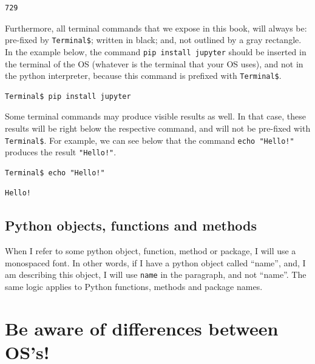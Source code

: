 \documentclass[
  11pt,
  letterpaper,
  DIV=11,
  numbers=noendperiod]{scrreprt}
\begin{document}
\begin{verbatim}
729
\end{verbatim}

Furthermore, all terminal commands that we expose in this book, will
always be: pre-fixed by \texttt{Terminal\$}; written in black; and, not
outlined by a gray rectangle. In the example below, the command
\texttt{pip\ install\ jupyter} should be inserted in the terminal of the
OS (whatever is the terminal that your OS uses), and not in the python
interpreter, because this command is prefixed with \texttt{Terminal\$}.

\begin{verbatim}
Terminal$ pip install jupyter
\end{verbatim}

Some terminal commands may produce visible results as well. In that
case, these results will be right below the respective command, and will
not be pre-fixed with \texttt{Terminal\$}. For example, we can see below
that the command \texttt{echo\ "Hello!"} produces the result
\texttt{"Hello!"}.

\begin{verbatim}
Terminal$ echo "Hello!"
\end{verbatim}

\begin{verbatim}
Hello!
\end{verbatim}

\hypertarget{python-objects-functions-and-methods}{%
\subsection*{Python objects, functions and
methods}\label{python-objects-functions-and-methods}}

When I refer to some python object, function, method or package, I will
use a monospaced font. In other words, if I have a python object called
``name'', and, I am describing this object, I will use \texttt{name} in
the paragraph, and not ``name''. The same logic applies to Python
functions, methods and package names.

\hypertarget{be-aware-of-differences-between-oss}{%
\section*{Be aware of differences between
OS's!}\label{be-aware-of-differences-between-oss}}
\end{document}

